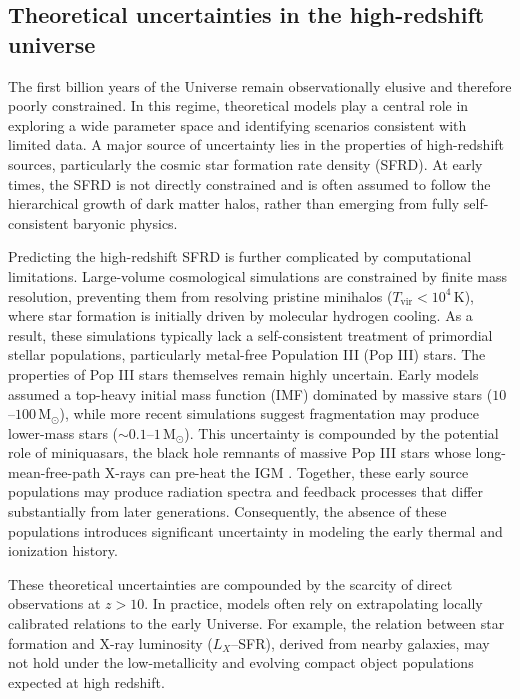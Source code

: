 \documentclass[apj,twocolumn, appendixfloats, twocolappendix, numberedappendix, tighten]{openjournal}
\begin{document}
\subsection{Theoretical uncertainties in the high-redshift universe} \label{sec:highz}


The first billion years of the Universe remain observationally elusive and therefore poorly constrained. In this regime, theoretical models play a central role in exploring a wide parameter space and identifying scenarios consistent with limited data. A major source of uncertainty lies in the properties of high-redshift sources, particularly the cosmic star formation rate density (SFRD). At early times, the SFRD is not directly constrained and is often assumed to follow the hierarchical growth of dark matter halos, rather than emerging from fully self-consistent baryonic physics.


Predicting the high-redshift SFRD is further complicated by computational limitations. Large-volume cosmological simulations are constrained by finite mass resolution, preventing them from resolving pristine minihalos ($T_\text{vir} < 10^4\,\mathrm{K}$), where star formation is initially driven by molecular hydrogen cooling. As a result, these simulations typically lack a self-consistent treatment of primordial stellar populations, particularly metal-free Population III (Pop III) stars. The properties of Pop III stars themselves remain highly uncertain. Early models assumed a top-heavy initial mass function (IMF) dominated by massive stars ($10$--$100\,\mathrm{M}_\odot$), while more recent simulations suggest fragmentation may produce lower-mass stars ($\sim 0.1$--$1\,\mathrm{M}_\odot$). This uncertainty is compounded by the potential role of miniquasars, the black hole remnants of massive Pop III stars whose long-mean-free-path X-rays can pre-heat the IGM \citep{Madau2004}. Together, these early source populations may produce radiation spectra and feedback processes that differ substantially from later generations. Consequently, the absence of these populations introduces significant uncertainty in modeling the early thermal and ionization history.


These theoretical uncertainties are compounded by the scarcity of direct observations at $z > 10$. In practice, models often rely on extrapolating locally calibrated relations to the early Universe. For example, the relation between star formation and X-ray luminosity ($L_X$--SFR), derived from nearby galaxies, may not hold under the low-metallicity and evolving compact object populations expected at high redshift.
\end{document}

